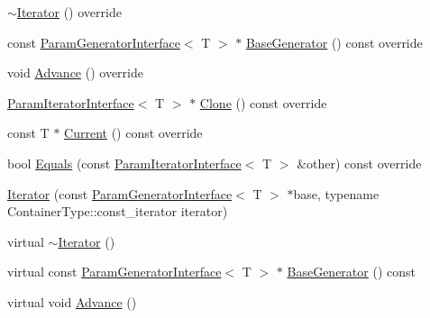 \begin{DoxyCompactItemize}
\item 
\mbox{\hyperlink{classtesting_1_1internal_1_1_values_in_iterator_range_generator_1_1_iterator_a265c1facb4cbd4669686d5f331df4a95}{$\sim$\+Iterator}} () override
\item 
const \mbox{\hyperlink{classtesting_1_1internal_1_1_param_generator_interface}{Param\+Generator\+Interface}}$<$ T $>$ $\ast$ \mbox{\hyperlink{classtesting_1_1internal_1_1_values_in_iterator_range_generator_1_1_iterator_a27445e4d010ffde9d3f2f9ada5d54d0f}{Base\+Generator}} () const override
\item 
void \mbox{\hyperlink{classtesting_1_1internal_1_1_values_in_iterator_range_generator_1_1_iterator_a5ff56489536cf5d90ed0ac07ffeb476b}{Advance}} () override
\item 
\mbox{\hyperlink{classtesting_1_1internal_1_1_param_iterator_interface}{Param\+Iterator\+Interface}}$<$ T $>$ $\ast$ \mbox{\hyperlink{classtesting_1_1internal_1_1_values_in_iterator_range_generator_1_1_iterator_a2c5ccf4da12cfb089829438d679ae35e}{Clone}} () const override
\item 
const T $\ast$ \mbox{\hyperlink{classtesting_1_1internal_1_1_values_in_iterator_range_generator_1_1_iterator_a55bd2a0d5a630478e32ec2efe08e37e4}{Current}} () const override
\item 
bool \mbox{\hyperlink{classtesting_1_1internal_1_1_values_in_iterator_range_generator_1_1_iterator_a75604bc318aca22ff8607b68bfb44e96}{Equals}} (const \mbox{\hyperlink{classtesting_1_1internal_1_1_param_iterator_interface}{Param\+Iterator\+Interface}}$<$ T $>$ \&other) const override
\item 
\mbox{\hyperlink{classtesting_1_1internal_1_1_values_in_iterator_range_generator_1_1_iterator_aebd635efe7082e6fc45bb8ae0dbefd2e}{Iterator}} (const \mbox{\hyperlink{classtesting_1_1internal_1_1_param_generator_interface}{Param\+Generator\+Interface}}$<$ T $>$ $\ast$base, typename Container\+Type\+::const\+\_\+iterator iterator)
\item 
virtual \mbox{\hyperlink{classtesting_1_1internal_1_1_values_in_iterator_range_generator_1_1_iterator_a4d271186bb12dec59e56361442b0dee9}{$\sim$\+Iterator}} ()
\item 
virtual const \mbox{\hyperlink{classtesting_1_1internal_1_1_param_generator_interface}{Param\+Generator\+Interface}}$<$ T $>$ $\ast$ \mbox{\hyperlink{classtesting_1_1internal_1_1_values_in_iterator_range_generator_1_1_iterator_a9095d3846a3eae6673e948d9c1fcd818}{Base\+Generator}} () const
\item 
virtual void \mbox{\hyperlink{classtesting_1_1internal_1_1_values_in_iterator_range_generator_1_1_iterator_a49e0c9d26983eb8c76cc9c8ac4469dbf}{Advance}} ()

\end{DoxyCompactItemize}
